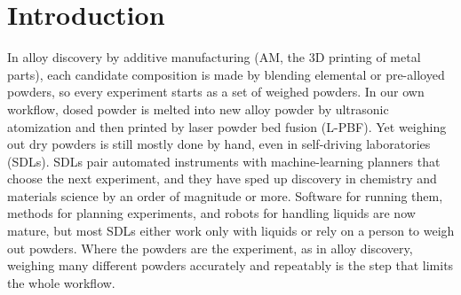 \documentclass[twoside,twocolumn,9pt]{article}
\begin{document}


\section{Introduction}

In alloy discovery by additive manufacturing (AM, the 3D printing of metal parts), each candidate composition is made by blending elemental or pre-alloyed powders,\cite{Li2018Combinatorial,Vecchio2021Throughput,Moorehead2020Throughput,Mooraj2024Additive,Nelaturu2024Multi} so every experiment starts as a set of weighed powders. In our own workflow, dosed powder is melted into new alloy powder by ultrasonic atomization and then printed by laser powder bed fusion (L-PBF). Yet weighing out dry powders is still mostly done by hand, even in self-driving laboratories (SDLs). SDLs pair automated instruments with machine-learning planners that choose the next experiment, and they have sped up discovery in chemistry and materials science by an order of magnitude or more.\cite{Abolhasani2023Rise,Tom2024Self,Szymanski2023Autonomous,Seifrid2022Autonomous} Software for running them,\cite{Fei2024Alabos,Guzik2023Decade} methods for planning experiments,\cite{Baird2026Honegumi} and robots for handling liquids are now mature, but most SDLs either work only with liquids or rely on a person to weigh out powders.\cite{Maffettone2023What,Canty2025Science} Where the powders are the experiment, as in alloy discovery, weighing many different powders accurately and repeatably is the step that limits the whole workflow.
\end{document}
